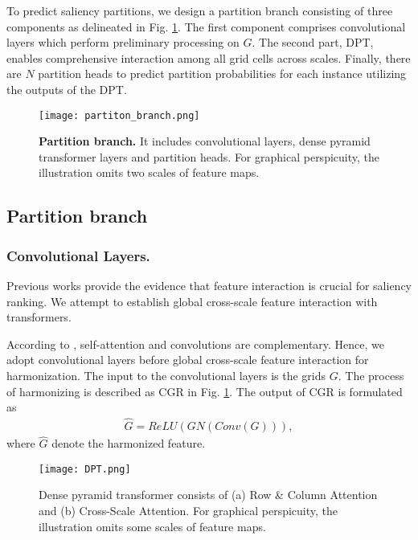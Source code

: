 \documentclass[sigconf]{acmart}
\begin{document}
To predict saliency partitions, we design a partition branch consisting of three components as delineated in Fig. \ref{fig:Rank Branch}. The first component comprises convolutional layers which perform preliminary processing on $G$. The second part, DPT, enables comprehensive interaction among all grid cells across scales. Finally, there are $N$ partition heads to predict partition probabilities for each instance utilizing the outputs of the DPT.

 \begin{figure}
	\begin{center}
		\texttt{[image: partiton\_branch.png]}
		\caption{\textbf{Partition branch.} It includes convolutional layers, dense pyramid transformer layers and partition heads. 
  For graphical perspicuity, the illustration omits two scales of feature maps.
		}\label{fig:Rank Branch}
	\end{center}
\end{figure}

\subsection{Partition branch} 
\subsubsection{Convolutional Layers.}
Previous works \cite{liu2021instance,fang2021salient,tian2022bi} provide the evidence that feature interaction is crucial for saliency ranking. 
We attempt to establish global cross-scale feature interaction with transformers.

According to \cite{park2022vision}, self-attention and convolutions are complementary. Hence, we adopt convolutional layers before global cross-scale feature interaction for harmonization. The input to the convolutional layers is the grids $G$. The process of harmonizing is described as CGR in Fig. \ref{fig:Rank Branch}. The output of CGR is formulated as
 \begin{equation}
 \begin{split}
\hat{G} = ReLU(GN(Conv(G))),
 \end{split}
 \end{equation}
where $\hat{G}$ denote the harmonized feature.


\begin{figure}
	\begin{center}
		\texttt{[image: DPT.png]}
		\caption{Dense pyramid transformer consists of (a) Row \& Column Attention and (b) Cross-Scale Attention. 
  For graphical perspicuity, the illustration omits some scales of feature maps.
		}\label{fig:cross-scale attention}
	\end{center}
\end{figure}
\end{document}
